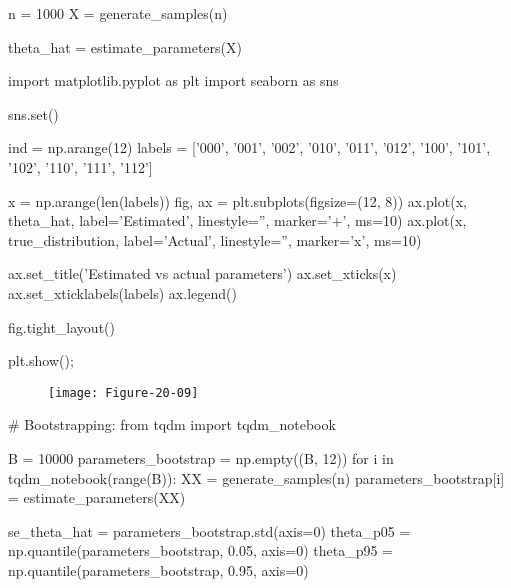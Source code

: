 \begin{python}
n = 1000
X = generate_samples(n)
\end{python}

\begin{python}
theta_hat = estimate_parameters(X)
\end{python}

\begin{python}
import matplotlib.pyplot as plt
import seaborn as sns

sns.set()

ind = np.arange(12)
labels = ['000', '001', '002', '010', '011', '012', '100', '101', '102', '110', '111', '112']

x = np.arange(len(labels))
fig, ax = plt.subplots(figsize=(12, 8))
ax.plot(x, theta_hat, label='Estimated', linestyle='', marker='+', ms=10)
ax.plot(x, true_distribution, label='Actual', linestyle='', marker='x', ms=10)

ax.set_title('Estimated vs actual parameters')
ax.set_xticks(x)
ax.set_xticklabels(labels)
ax.legend()

fig.tight_layout()

plt.show();
\end{python}

\begin{figure}[H]
\centering
\texttt{[image: Figure-20-09]}
\end{figure}

\begin{python}
# Bootstrapping:
from tqdm import tqdm_{n}otebook

B = 10000
parameters_bootstrap = np.empty((B, 12))
for i in tqdm_{n}otebook(range(B)):
    XX = generate_samples(n)
    parameters_bootstrap[i] = estimate_parameters(XX)
    
se_theta_hat = parameters_bootstrap.std(axis=0)
theta_p05 = np.quantile(parameters_bootstrap, 0.05, axis=0)
theta_p95 = np.quantile(parameters_bootstrap, 0.95, axis=0)
\end{python}

